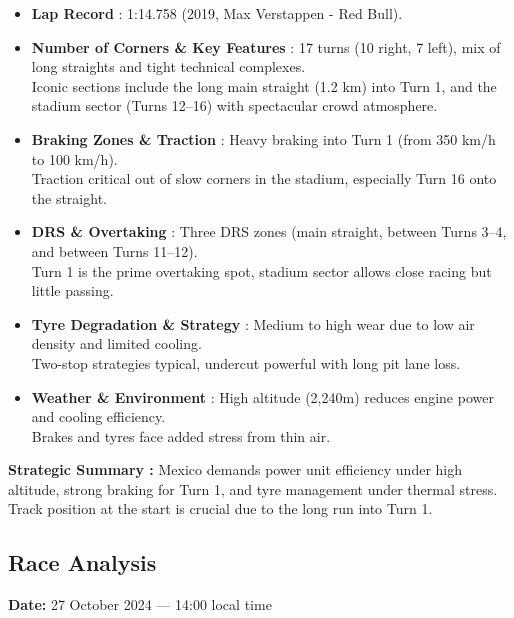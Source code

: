 \begin{itemize}
    \item \textbf{Lap Record} : 1:14.758 (2019, Max Verstappen - Red Bull).
    
    \item \textbf{Number of Corners \& Key Features} : 17 turns (10 right, 7 left), mix of long straights and tight technical complexes. \\
    Iconic sections include the long main straight (1.2 km) into Turn 1, and the stadium sector (Turns 12–16) with spectacular crowd atmosphere.
    
    \item \textbf{Braking Zones \& Traction} : Heavy braking into Turn 1 (from 350 km/h to 100 km/h). \\
    Traction critical out of slow corners in the stadium, especially Turn 16 onto the straight.
    
    \item \textbf{DRS \& Overtaking} : Three DRS zones (main straight, between Turns 3–4, and between Turns 11–12). \\
    Turn 1 is the prime overtaking spot, stadium sector allows close racing but little passing.
    
    \item \textbf{Tyre Degradation \& Strategy} : Medium to high wear due to low air density and limited cooling. \\
    Two-stop strategies typical, undercut powerful with long pit lane loss.
    
    \item \textbf{Weather \& Environment} : High altitude (2,240m) reduces engine power and cooling efficiency. \\
    Brakes and tyres face added stress from thin air.
\end{itemize}

\textbf{Strategic Summary :} Mexico demands power unit efficiency under high altitude, strong braking for Turn 1, and tyre management under thermal stress. Track position at the start is crucial due to the long run into Turn 1.

\subsection{Race Analysis}

\textbf{Date:} 27 October 2024 — 14:00 local time 

